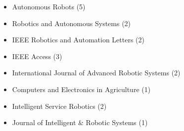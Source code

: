 \begin{itemize}
	\item Autonomous Robots (5)
	\item Robotics and Autonomous Systems (2)
	\item IEEE Robotics and Automation Letters (2)
	\item IEEE Access (3)
	\item International Journal of Advanced Robotic Systems (2)
	\item Computers and Electronics in Agriculture (1)
	\item Intelligent Service Robotics (2)
	\item Journal of Intelligent \& Robotic Systems (1)
\end{itemize}